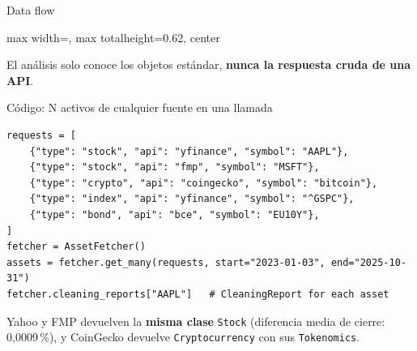 \documentclass[aspectratio=169,10pt]{beamer}
\newcommand{\code}[1]{\texttt{\color{accent}#1}}
\begin{document}
\begin{frame}{Data flow}
\begin{adjustbox}{max width=\textwidth, max totalheight=0.62\textheight, center}
  \end{adjustbox}

  \vspace{0.4em}
  \centering
  {\small El análisis solo conoce los objetos estándar, \textbf{nunca la respuesta cruda de una API}.}
\end{frame}

\begin{frame}[fragile]{Código: N activos de cualquier fuente en una llamada}
\begin{lstlisting}
requests = [
    {"type": "stock", "api": "yfinance", "symbol": "AAPL"},
    {"type": "stock", "api": "fmp", "symbol": "MSFT"},
    {"type": "crypto", "api": "coingecko", "symbol": "bitcoin"},
    {"type": "index", "api": "yfinance", "symbol": "^GSPC"},
    {"type": "bond", "api": "bce", "symbol": "EU10Y"},
]
fetcher = AssetFetcher()
assets = fetcher.get_many(requests, start="2023-01-03", end="2025-10-31")
fetcher.cleaning_reports["AAPL"]   # CleaningReport for each asset
\end{lstlisting}
  \vspace{0.5em}
  \small
  Yahoo y FMP devuelven la \textbf{misma clase} \code{Stock} (diferencia media de cierre: 0,0009\,\%), y CoinGecko devuelve \code{Cryptocurrency} con sus \code{Tokenomics}.
\end{frame}
\end{document}
